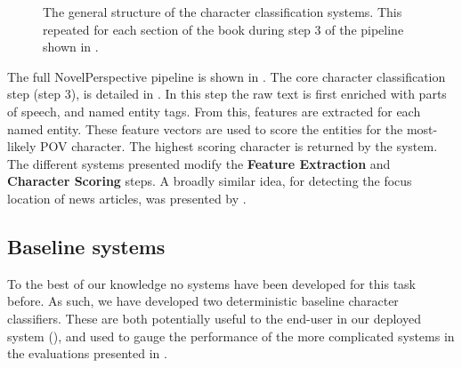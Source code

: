 \documentclass[11pt,a4paper]{article}
\newcommand{\textcite}{\cite}
\begin{document}
\begin{figure*}
	\caption{The general structure of the character classification systems. This repeated for each section of the book during step 3 of the pipeline shown in . \label{fig:classify}}
\end{figure*}

The full NovelPerspective pipeline is shown in .
The core character classification step (step 3), is detailed in .
In this step the raw text is first enriched with parts of speech, and named entity tags.
From this, features are extracted for each named entity.
These feature vectors are used to score the entities for the most-likely POV character.
The highest scoring character is returned by the system.
The different systems presented modify the \textbf{Feature Extraction} and \textbf{Character Scoring} steps.
A broadly similar idea, for detecting the focus location of news articles, was presented by \textcite{2017focus}.


\subsection{Baseline systems}
To the best of our knowledge no systems have been developed for this task before.
As such, we have developed two deterministic baseline character classifiers.
These are both potentially useful to the end-user in our deployed system (), and used to gauge the performance of the more complicated systems in the evaluations presented in .
\end{document}
